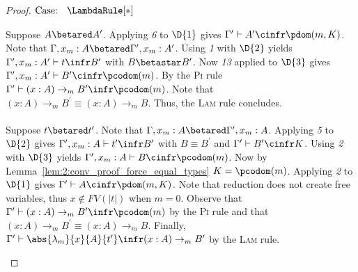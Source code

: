 \begin{proof}
    $\text{Case: }\begin{array}{c} \LambdaRule[*] \end{array}$
    \begin{proofcase}
        Suppose $A \betared A^\prime$.
        Applying \textit{6} to $\D{1}$ gives $\Gamma^\prime \vdash A^\prime \cinfr \pdom(m, K)$.
        Note that $\Gamma, x_m : A \betared \Gamma^\prime, x_m : A^\prime$.
        Using \textit{1} with $\D{2}$ yields $\Gamma^\prime, x_m : A^\prime \vdash t \infr B^\prime$ with $B \betastar B^\prime$.
        Now \textit{13} applied to $\D{3}$ gives $\Gamma^\prime, x_m : A^\prime \vdash B^\prime \cinfr \pcodom(m)$.
        By the \textsc{Pi} rule $\Gamma^\prime \vdash (x : A) \to_m B^\prime \infr \pcodom(m)$.
        Note that $(x : A) \to_m B^\prime \equiv (x : A) \to_m B$.
        Thus, the \textsc{Lam} rule concludes.
        \\ \\
        Suppose $t \betared t^\prime$.
        Note that $\Gamma, x_m : A \betared \Gamma^\prime, x_m : A$.
        Applying \textit{5} to $\D{2}$ gives $\Gamma^\prime, x_m : A \vdash t^\prime \infr B^\prime$ with $B \equiv B^\prime$ and $\Gamma^\prime \vdash B^\prime \cinfr K$.
        Using \textit{2} with $\D{3}$ yields $\Gamma^\prime, x_m : A \vdash B \cinfr \pcodom(m)$.
        Now by Lemma~\ref{lem:2:conv_proof_force_equal_types} $K = \pcodom(m)$.
        Applying \textit{2} to $\D{1}$ gives $\Gamma^\prime \vdash A \cinfr \pdom(m, K)$.
        Note that reduction does not create free variables, thus $x \notin FV(|t|)$ when $m = 0$.
        Observe that $\Gamma^\prime \vdash (x : A) \to_m B^\prime \infr \pcodom(m)$ by the \textsc{Pi} rule and that $(x : A) \to_m B^\prime \equiv (x : A) \to_m B$.
        Finally, $\Gamma^\prime \vdash \abs{\lambda_m}{x}{A}{t^\prime} \infr (x : A) \to_m B^\prime$ by the \textsc{Lam} rule.
    \end{proofcase}


\end{proof}

